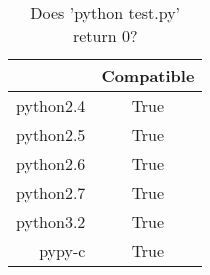 \begin{table}[ht]
	\begin{center}
	\caption{Does 'python test.py' return 0?}
	\label{tab:compatibleTable}
		\begin{tabular}{rc}
		\toprule
			 & Compatible\\
			\midrule
			python2.4 & True\\
			python2.5 & True\\
			python2.6 & True\\
			python2.7 & True\\
			python3.2 & True\\
			pypy-c & True\\
		\bottomrule
		\end{tabular}
	\end{center}
\end{table}